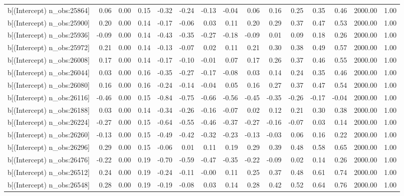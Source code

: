 \begin{table}[ht]
\begin{tabular}{rrrrrrrrrrrrrrr}
  b[(Intercept) n\_obs:25864] & 0.06 & 0.00 & 0.15 & -0.32 & -0.24 & -0.13 & -0.04 & 0.06 & 0.16 & 0.25 & 0.35 & 0.46 & 2000.00 & 1.00 \\ 
  b[(Intercept) n\_obs:25900] & 0.20 & 0.00 & 0.14 & -0.17 & -0.06 & 0.03 & 0.11 & 0.20 & 0.29 & 0.37 & 0.47 & 0.53 & 2000.00 & 1.00 \\ 
  b[(Intercept) n\_obs:25936] & -0.09 & 0.00 & 0.14 & -0.43 & -0.35 & -0.27 & -0.18 & -0.09 & 0.01 & 0.09 & 0.18 & 0.26 & 2000.00 & 1.00 \\ 
  b[(Intercept) n\_obs:25972] & 0.21 & 0.00 & 0.14 & -0.13 & -0.07 & 0.02 & 0.11 & 0.21 & 0.30 & 0.38 & 0.49 & 0.57 & 2000.00 & 1.00 \\ 
  b[(Intercept) n\_obs:26008] & 0.17 & 0.00 & 0.14 & -0.17 & -0.10 & -0.01 & 0.07 & 0.17 & 0.26 & 0.37 & 0.46 & 0.55 & 2000.00 & 1.00 \\ 
  b[(Intercept) n\_obs:26044] & 0.03 & 0.00 & 0.16 & -0.35 & -0.27 & -0.17 & -0.08 & 0.03 & 0.14 & 0.24 & 0.35 & 0.46 & 2000.00 & 1.00 \\ 
  b[(Intercept) n\_obs:26080] & 0.16 & 0.00 & 0.16 & -0.24 & -0.14 & -0.04 & 0.05 & 0.16 & 0.27 & 0.37 & 0.47 & 0.54 & 2000.00 & 1.00 \\ 
  b[(Intercept) n\_obs:26116] & -0.46 & 0.00 & 0.15 & -0.84 & -0.75 & -0.66 & -0.56 & -0.45 & -0.35 & -0.26 & -0.17 & -0.04 & 2000.00 & 1.00 \\ 
  b[(Intercept) n\_obs:26188] & 0.03 & 0.00 & 0.14 & -0.34 & -0.26 & -0.16 & -0.07 & 0.02 & 0.12 & 0.21 & 0.30 & 0.38 & 2000.00 & 1.00 \\ 
  b[(Intercept) n\_obs:26224] & -0.27 & 0.00 & 0.15 & -0.64 & -0.55 & -0.46 & -0.37 & -0.27 & -0.16 & -0.07 & 0.03 & 0.14 & 2000.00 & 1.00 \\ 
  b[(Intercept) n\_obs:26260] & -0.13 & 0.00 & 0.15 & -0.49 & -0.42 & -0.32 & -0.23 & -0.13 & -0.03 & 0.06 & 0.16 & 0.22 & 2000.00 & 1.00 \\ 
  b[(Intercept) n\_obs:26296] & 0.29 & 0.00 & 0.15 & -0.06 & 0.01 & 0.11 & 0.19 & 0.29 & 0.39 & 0.48 & 0.58 & 0.65 & 2000.00 & 1.00 \\ 
  b[(Intercept) n\_obs:26476] & -0.22 & 0.00 & 0.19 & -0.70 & -0.59 & -0.47 & -0.35 & -0.22 & -0.09 & 0.02 & 0.14 & 0.26 & 2000.00 & 1.00 \\ 
  b[(Intercept) n\_obs:26512] & 0.24 & 0.00 & 0.19 & -0.24 & -0.11 & -0.00 & 0.11 & 0.25 & 0.37 & 0.48 & 0.61 & 0.74 & 2000.00 & 1.00 \\ 
  b[(Intercept) n\_obs:26548] & 0.28 & 0.00 & 0.19 & -0.19 & -0.08 & 0.03 & 0.14 & 0.28 & 0.42 & 0.52 & 0.64 & 0.76 & 2000.00 & 1.00 \\ 

\end{tabular}
\end{table}
